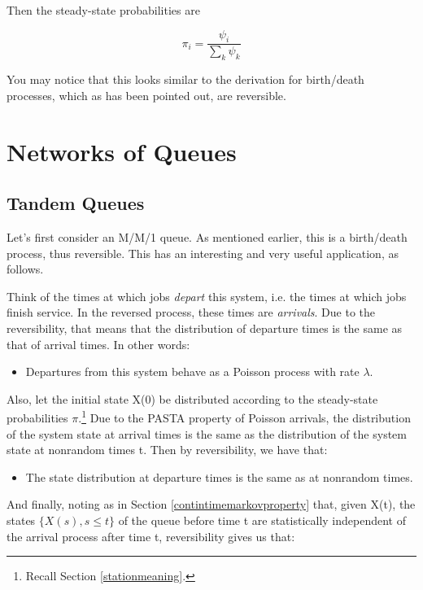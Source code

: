 Then the steady-state probabilities are 

\begin{equation}
\pi_i = \frac{\psi_i}{\sum_k \psi_k}
\end{equation} 

You may notice that this looks similar to the derivation for birth/death
processes, which as has been pointed out, are reversible.

\section{Networks of Queues}

\subsection{Tandem Queues}

Let's first consider an M/M/1 queue.  As mentioned earlier, this is a
birth/death process, thus reversible.  This has an interesting and very
useful application, as follows.

Think of the times at which jobs {\it depart} this system, i.e. the
times at which jobs finish service.  In the reversed process, these
times are {\it arrivals}.  Due to the reversibility, that means that the
distribution of departure times is the same as that of arrival times.
In other words:

\begin{itemize}

\item Departures from this system behave as a Poisson process with rate
$\lambda$.

\end{itemize}

Also, let the initial state X(0) be distributed according to the
steady-state probabilities $\pi$.\footnote{Recall Section
\ref{stationmeaning}.} Due to the PASTA property of Poisson arrivals,
the distribution of the system state at arrival times is the same as the
distribution of the system state at nonrandom times t.  Then by
reversibility, we have that:

\begin{itemize}

\item The state distribution at departure times is the same as at
nonrandom times.

\end{itemize}

And finally, noting as in Section \ref{contintimemarkovproperty} that,
given X(t), the states $\{ X(s), s \leq t \}$ of the queue before time t
are statistically independent of the arrival process after time t,
reversibility gives us that: 

